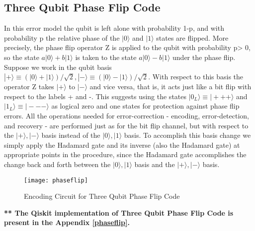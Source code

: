 \documentclass[12pt]{report}
\begin{document}
\subsection{Three Qubit Phase Flip Code}
In this error model the qubit is left alone with probability 1-p, and with probability p the relative phase of the $|0\rangle$ and $|1\rangle$ states are flipped. More precisely, the phase flip operator Z is applied to the qubit with probability p> 0, so the state $a|0\rangle+b|1\rangle$ is taken to the state $a|0\rangle-b|1\rangle$ under the phase flip. Suppose we work in the qubit basis $|+\rangle \equiv (|0\rangle + |1\rangle)/\sqrt{2}, |-\rangle \equiv (|0\rangle - |1\rangle)/\sqrt{2}$. With respect to this basis the operator Z takes $|+\rangle$ to $|-\rangle$ and vice versa, that is, it acts just like a bit flip with respect to the labels + and -. This suggests using the states $|0_L\rangle \equiv |+++\rangle$ and $|1_L\rangle \equiv | - - -\rangle$ as logical zero and one states for protection against phase flip errors. All the operations needed for error-correction - encoding, error-detection, and recovery - are performed just as for the bit flip channel, but with respect to the $|+\rangle, |-\rangle$ basis instead of the $|0\rangle, |1\rangle$ basis. To accomplish this basis change we simply apply the Hadamard gate and its inverse (also the Hadamard gate) at appropriate points in the procedure, since the Hadamard gate accomplishes the change back and forth between the $|0\rangle, |1\rangle$ basis and the $|+\rangle, |-\rangle$ basis.\\
\begin{figure}[h]
\centering
\texttt{[image: phaseflip]}
\caption{Encoding Circuit for Three Qubit Phase Flip Code}
\label{fig:phaseflip}
\end{figure}
\textbf{** The Qiskit implementation of Three Qubit Phase Flip Code is present in the Appendix \ref{phaseflip}.}
\end{document}
